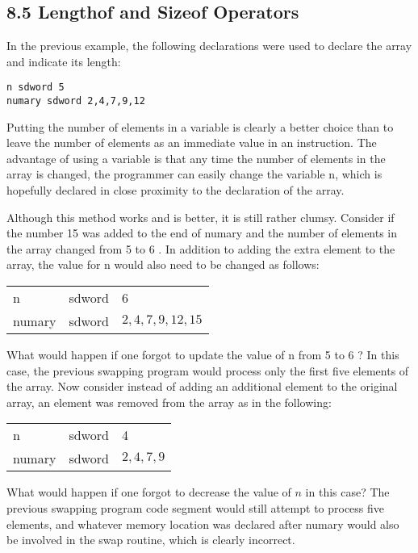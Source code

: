 \documentclass[10pt]{article}
\begin{document}
\subsection*{8.5 Lengthof and Sizeof Operators}
In the previous example, the following declarations were used to declare the array and indicate its length:

\begin{verbatim}
n sdword 5
numary sdword 2,4,7,9,12
\end{verbatim}

Putting the number of elements in a variable is clearly a better choice than to leave the number of elements as an immediate value in an instruction. The advantage of using a variable is that any time the number of elements in the array is changed, the programmer can easily change the variable n, which is hopefully declared in close proximity to the declaration of the array.

Although this method works and is better, it is still rather clumsy. Consider if the number 15 was added to the end of numary and the number of elements in the array changed from 5 to 6 . In addition to adding the extra element to the array, the value for n would also need to be changed as follows:

\begin{center}
\begin{tabular}{lll}
n & sdword & 6 \\
numary & sdword & $2,4,7,9,12,15$ \\
\end{tabular}
\end{center}

What would happen if one forgot to update the value of n from 5 to 6 ? In this case, the previous swapping program would process only the first five elements of the array. Now consider instead of adding an additional element to the original array, an element was removed from the array as in the following:

\begin{center}
\begin{tabular}{lll}
n & sdword & 4 \\
numary & sdword & $2,4,7,9$ \\
\end{tabular}
\end{center}

What would happen if one forgot to decrease the value of $n$ in this case? The previous swapping program code segment would still attempt to process five elements, and whatever memory location was declared after numary would also be involved in the swap routine, which is clearly incorrect.
\end{document}
